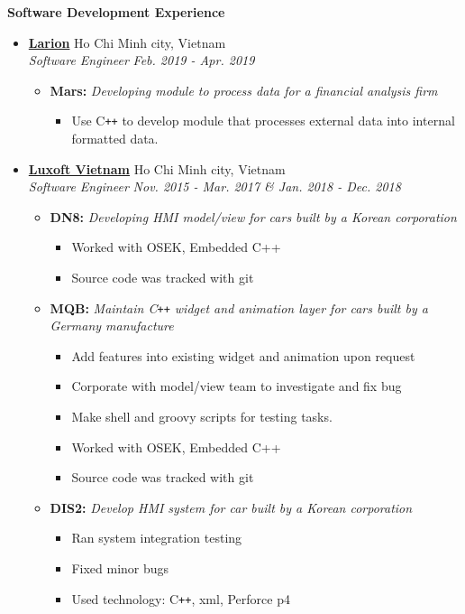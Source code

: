 \documentclass[letterpaper,11pt]{article}
\newcommand{\resheading}[1]{
  {\large \colorbox{mygrey}
    {\begin{minipage}{\textwidth}
      {\textbf{#1 \vphantom{p\^{E}}}}
    \end{minipage}}}}
\newcommand{\ressubheading}[4]{
		\textbf{#1} \hfill #2 \\
    \textit{#3} \hfill \textit{#4}}
\newcommand{\resproject}[2]{
  \textbf{#1:} \textit{#2}}
\def\Plus{\texttt{+}}
\def\cplusplus{C\Plus\Plus}
\begin{document}
\resheading{Software Development Experience}
\begin{itemize}
\item \ressubheading{\href{https://www.larion.com/}{Larion}}{Ho Chi Minh city,
    Vietnam}{Software Engineer}{Feb. 2019 - Apr. 2019}
  \begin{itemize}
    \item \resproject{Mars}{Developing module to process data for a financial
      analysis firm}
      \begin{itemize}
        \item Use \cplusplus{} to develop module that processes external
          data into internal formatted data.
      \end{itemize}
  \end{itemize}

\item \ressubheading{\href{https://www.luxoft.com/}{Luxoft Vietnam}}{Ho Chi Minh
    city, Vietnam}{Software Engineer}{Nov. 2015 - Mar. 2017 \& Jan. 2018 - Dec. 2018}
  \begin{itemize}
    \item \resproject{DN8}{Developing HMI model/view for cars built by
      a Korean corporation}
      \begin{itemize}
        \item Worked with OSEK, Embedded C++
        \item Source code was tracked with git
      \end{itemize}
    \item \resproject{MQB}{Maintain \cplusplus{} widget and animation layer
      for cars built by a Germany manufacture}
      \begin{itemize}
        \item Add features into existing widget and animation upon request
        \item Corporate with model/view team to investigate and fix bug
        \item Make shell and groovy scripts for testing tasks.
        \item Worked with OSEK, Embedded C++
        \item Source code was tracked with git
      \end{itemize}
    \item \resproject{DIS2}{Develop HMI system for car built by a Korean
      corporation}
      \begin{itemize}
        \item Ran system integration testing
        \item Fixed minor bugs
        \item Used technology: \cplusplus{}, xml, Perforce p4
      \end{itemize}
  \end{itemize}


\end{itemize}
\end{document}
